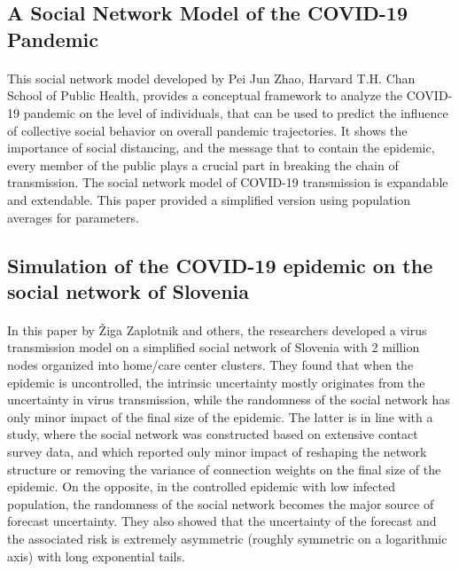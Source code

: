 \documentclass[14pt, a4paper]{extarticle}
\begin{document}
	    \subsection{A Social Network Model of the COVID-19 Pandemic}
	        \paragraph{} This social network model developed by Pei Jun Zhao, Harvard T.H. Chan School of Public Health, provides a conceptual framework to analyze the COVID-19 pandemic on the level of individuals, that can be used to predict the influence of collective social behavior on overall pandemic trajectories. It shows the importance of social distancing, and the message that to contain the epidemic, every member of the public plays a crucial part in breaking the chain of transmission. The social network model of COVID-19 transmission is expandable and extendable. This paper provided a simplified version using population averages for parameters.
	    
	    \subsection{Simulation of the COVID-19 epidemic on the social network of Slovenia}
	        \paragraph{} In this paper by Žiga Zaplotnik and others, the researchers developed a virus transmission model on a simplified social network of Slovenia with 2 million nodes organized into home/care center clusters. They found that when the epidemic is uncontrolled, the intrinsic uncertainty mostly originates from the uncertainty in virus transmission, while the randomness of the social network has only minor impact of the final size of the epidemic. The latter is in line with a study, where the social network was constructed based on extensive contact survey data, and which reported only minor impact of reshaping the network structure or removing the variance of connection weights on the final size of the epidemic. On the opposite, in the controlled epidemic with low infected population, the randomness of the social network becomes the major source of forecast uncertainty. They also showed that the uncertainty of the forecast and the associated risk is extremely asymmetric (roughly symmetric on a logarithmic axis) with long exponential tails.
	
\end{document}
